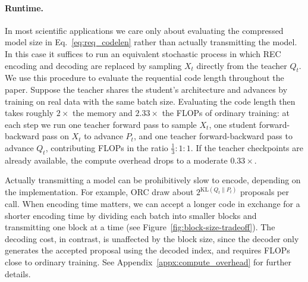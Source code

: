 \documentclass{article}
\theoremstyle{plain}
\theoremstyle{definition}
\theoremstyle{remark}
\begin{document}
\paragraph{Runtime.} In most scientific applications we care only about evaluating the compressed model size in Eq.~\eqref{eq:req_codelen} rather than actually transmitting the model. In this case it suffices to run an equivalent stochastic process in which REC encoding and decoding are replaced by sampling $X_t$ directly from the teacher $Q_t$. We use this procedure to evaluate the requential code length throughout the paper. Suppose the teacher shares the student's architecture and advances by training on real data with the same batch size. Evaluating the code length then takes roughly $2\times$ the memory and $2.33\times$ the FLOPs of ordinary training: at each step we run one teacher forward pass to sample $X_t$, one student forward-backward pass on $X_t$ to advance $P_t$, and one teacher forward-backward pass to advance $Q_t$, contributing FLOPs in the ratio $\frac{1}{3}:1:1$. If the teacher checkpoints are already available, the compute overhead drops to a moderate $0.33\times$.

Actually transmitting a model can be prohibitively slow to encode, depending on the implementation.
%
For example, ORC draw about $2^{\mathrm{KL}(Q_t\|P_t)}$ proposals per call. 
When encoding time matters, we can accept a longer code in exchange for a shorter encoding time by dividing each batch into smaller blocks and transmitting one block at a time (see Figure~\ref{fig:block-size-tradeoff}). The decoding cost, in contrast, is unaffected by the block size, since the decoder only generates the accepted proposal using the decoded index, and requires FLOPs close to ordinary training. See Appendix~\ref{appx:compute_overhead} for further details.

%

%
%
%
%
%
%
%
%
%
%
%
%
%
%
%
%
%
%
%
%
%
%
%
%
%
%
%
%
%
%
%
%
%
%




%
%
%
%
%
%
%
%
%
%
%
%
%
%
%
%
%
%
%
%
%
%
%
%
%
%
%
%
%
%
%
%
%
%



%



%

%
\end{document}
